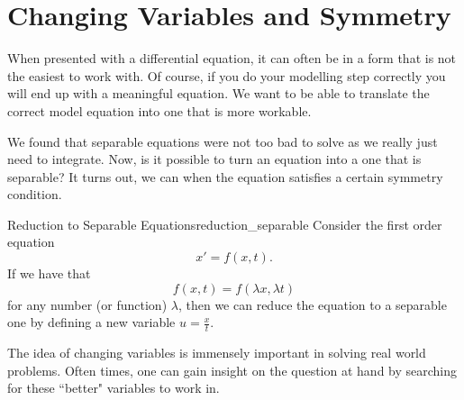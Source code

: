        \section{Changing Variables and Symmetry}
        
        When presented with a differential equation, it can often be in a form that is not the easiest to work with.  Of course, if you do your modelling step correctly you will end up with a meaningful equation.  We want to be able to translate the correct model equation into one that is more workable.  
        
        We found that separable equations were not too bad to solve as we really just need to integrate.  Now, is it possible to turn an equation into a one that is separable? It turns out, we can when the equation satisfies a certain symmetry condition.  
        
        \begin{prop}{Reduction to Separable Equations}{reduction_separable}
            Consider the first order equation
            \[
            x'=f(x,t).
            \]
            If we have that
            \[
            f(x,t)=f(\lambda x, \lambda t)
            \]
            for any number (or function) $\lambda$, then we can reduce the equation to a separable one by defining a new variable $u=\frac{x}{t}$.
        \end{prop}
        
        The idea of changing variables is immensely important in solving real world problems.  Often times, one can gain insight on the question at hand by searching for these ``better" variables to work in.  
        
